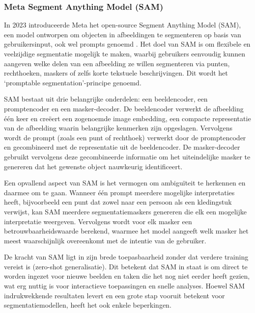 \subsubsection{Meta Segment Anything Model (SAM)}

In 2023 introduceerde Meta het open-source Segment Anything Model (SAM), een model ontworpen om objecten in afbeeldingen te segmenteren op basis van gebruikersinput, ook wel prompts genoemd \autocite{Kirillov2023}. 
Het doel van SAM is om flexibele en veelzijdige segmentatie mogelijk te maken, waarbij gebruikers eenvoudig kunnen aangeven welke delen van een afbeelding ze willen segmenteren via punten, 
rechthoeken, maskers of zelfs korte tekstuele beschrijvingen. Dit wordt het `promptable segmentation'-principe genoemd.
\newline \par
SAM bestaat uit drie belangrijke onderdelen: een beeldencoder, een promptencoder en een masker-decoder. 
De beeldencoder verwerkt de afbeelding één keer en creëert een zogenoemde image embedding, een compacte representatie van de afbeelding waarin belangrijke kenmerken zijn opgeslagen. 
Vervolgens wordt de prompt (zoals een punt of rechthoek) verwerkt door de promptencoder en gecombineerd met de representatie uit de beeldencoder. 
De masker-decoder gebruikt vervolgens deze gecombineerde informatie om het uiteindelijke masker te genereren dat het gewenste object nauwkeurig identificeert.
\newline \par
Een opvallend aspect van SAM is het vermogen om ambiguïteit te herkennen en daarmee om te gaan. 
Wanneer één prompt meerdere mogelijke interpretaties heeft, bijvoorbeeld een punt dat zowel naar een persoon als een kledingstuk verwijst, kan SAM meerdere segmentatiemaskers genereren die elk een mogelijke interpretatie weergeven. 
Vervolgens wordt voor elk masker een betrouwbaarheidswaarde berekend, waarmee het model aangeeft welk masker het meest waarschijnlijk overeenkomt met de intentie van de gebruiker.
\newline \par
De kracht van SAM ligt in zijn brede toepasbaarheid zonder dat verdere training vereist is (zero-shot generalisatie). 
Dit betekent dat SAM in staat is om direct te worden ingezet voor nieuwe beelden en taken die het nog niet eerder heeft gezien, wat erg nuttig is voor interactieve toepassingen en snelle analyses.
Hoewel SAM indrukwekkende resultaten levert en een grote stap vooruit betekent voor segmentatiemodellen, heeft het ook enkele beperkingen. 
